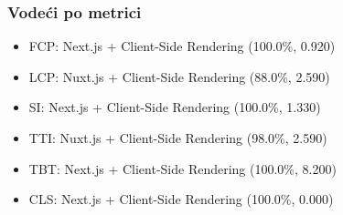 \subsubsection{Vodeći po metrici}
\begin{itemize}
    \item FCP: Next.js + Client-Side Rendering (100.0\%, 0.920)
    \item LCP: Nuxt.js + Client-Side Rendering (88.0\%, 2.590)
    \item SI: Next.js + Client-Side Rendering (100.0\%, 1.330)
    \item TTI: Nuxt.js + Client-Side Rendering (98.0\%, 2.590)
    \item TBT: Next.js + Client-Side Rendering (100.0\%, 8.200)
    \item CLS: Next.js + Client-Side Rendering (100.0\%, 0.000)
\end{itemize}

